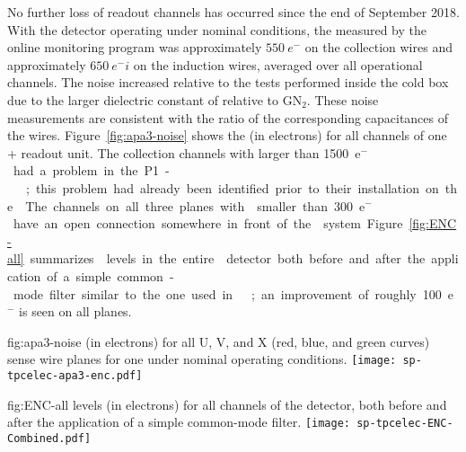 No further loss of readout channels has occurred since 
the end of September 2018.
With the detector operating under nominal %
conditions, the 
measured by the online monitoring program was approximately $\SI{550}{e^-}$ 
on the collection wires and approximately $\SI{650}{e^-i}$ on the induction
wires, averaged over all operational channels. The noise increased %
relative to the tests performed inside the cold box due to the 
larger dielectric constant of  relative to GN$_2$. 
These noise measurements  %
are consistent with the 
ratio of the corresponding capacitances of the  wires. 
Figure~\ref{fig:apa3-noise} 
shows the  (in electrons) for all channels of one %
+ readout unit. %
The collection channels with  larger than \SI{1500}{e$^-$} had a problem %
 in the P1- 
;  %
this problem had already
been identified %
prior to their
installation on the . The channels on all three planes 
with  smaller than \SI{300}{e$^-$} have an open connection somewhere in 
front of the  system. Figure~\ref{fig:ENC-all} summarizes
 levels in the entire  detector both before and
after the application of a simple common-mode filter similar
to the one used in ~\cite{Acciarri:2017sde};
an improvement of roughly 100~e$^-$ is seen on all planes. %

\begin{dunefigure}
{fig:apa3-noise}
{ (in electrons) for all U, V, and X (red, blue, and green curves) sense 
wire planes for one   %
under nominal operating 
conditions.}
\texttt{[image: sp-tpcelec-apa3-enc.pdf]}
\end{dunefigure}

\begin{dunefigure}
{fig:ENC-all}
{ levels (in electrons) for all channels of the  detector, both
before and after the application of a simple common-mode filter.}
\texttt{[image: sp-tpcelec-ENC-Combined.pdf]}
\end{dunefigure}

